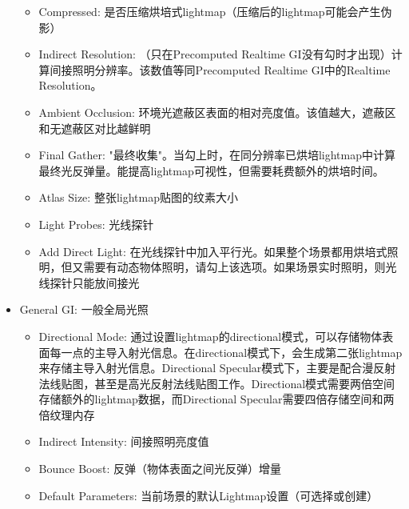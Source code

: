 \documentclass[9pt, b5paper]{article}
\begin{document}
\begin{itemize}
\begin{itemize}
\item Compressed: 是否压缩烘培式lightmap（压缩后的lightmap可能会产生伪影）
\item Indirect Resolution: （只在Precomputed Realtime GI没有勾时才出现）计算间接照明分辨率。该数值等同Precomputed Realtime GI中的Realtime Resolution。
\item Ambient Occlusion: 环境光遮蔽区表面的相对亮度值。该值越大，遮蔽区和无遮蔽区对比越鲜明
\item Final Gather: "最终收集"。当勾上时，在同分辨率已烘培lightmap中计算最终光反弹量。能提高lightmap可视性，但需要耗费额外的烘培时间。
\item Atlas Size: 整张lightmap贴图的纹素大小
\item Light Probes: 光线探针
\item Add Direct Light: 在光线探针中加入平行光。如果整个场景都用烘培式照明，但又需要有动态物体照明，请勾上该选项。如果场景实时照明，则光线探针只能放间接光
\end{itemize}
\item General GI: 一般全局光照
\begin{itemize}
\item Directional Mode: 通过设置lightmap的directional模式，可以存储物体表面每一点的主导入射光信息。在directional模式下，会生成第二张lightmap来存储主导入射光信息。Directional Specular模式下，主要是配合漫反射法线贴图，甚至是高光反射法线贴图工作。Directional模式需要两倍空间存储额外的lightmap数据，而Directional Specular需要四倍存储空间和两倍纹理内存
\item Indirect Intensity: 间接照明亮度值
\item Bounce Boost: 反弹（物体表面之间光反弹）增量
\item Default Parameters: 当前场景的默认Lightmap设置（可选择或创建）
\end{itemize}


\end{itemize}
\end{document}
